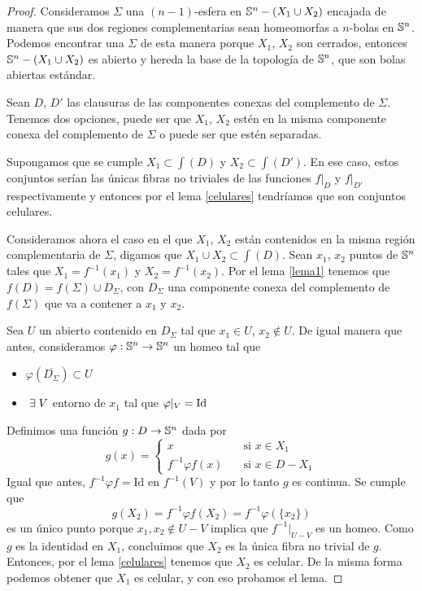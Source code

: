 \begin{proof}
    Consideramos $\Sigma$ una $(n-1)$-esfera en $\mathbb{S}^n-(X_1\cup X_2)$ encajada de manera que sus dos regiones complementarias sean homeomorfas a $n$-bolas en $\mathbb{S}^n$. Podemos encontrar una $\Sigma$ de esta manera porque $X_1$, $X_2$ son cerrados, entonces $\mathbb{S}^n - (X_1\cup X_2)$ es abierto y hereda la base de la topología de $\mathbb{S}^n$, que son bolas abiertas estándar.


    Sean $D$, $D'$ las clausuras de las componentes conexas del complemento de $\Sigma$.  Tenemos dos opciones, puede ser que $X_1$, $X_2$ estén en la misma componente conexa del complemento de $\Sigma$ o puede ser que estén separadas. 
    
    Supongamos que se cumple $X_1\subset\int(D)$ y $X_2\subset\int(D')$. En ese caso, estos conjuntos serían las únicas fibras no triviales de las funciones $f|_{D}$ y $f|_{D'}$ respectivamente y entonces por el lema \ref{celulares} tendríamos que son conjuntos celulares.

    Consideramos ahora el caso en el que $X_1$, $X_2$ están contenidos en la misma región complementaria de $\Sigma$, digamos que $X_1\cup X_2\subset\int(D)$. Sean $x_1,\, x_2$ puntos de $\mathbb{S}^n$ tales que $X_1=f^{-1}(x_1)$ y $X_2=f^{-1}(x_2)$. Por el lema \ref{lema1} tenemos que $f(D)=f(\Sigma)\cup D_\Sigma$, con $D_\Sigma$ una componente conexa del complemento de $f(\Sigma)$ que va a contener a $x_1$ y $x_2$.

    Sea $U$ un abierto contenido en $D_\Sigma$ tal que $x_1\in U$, $x_2\not\in U$. De igual manera que antes, consideramos $\varphi:\mathbb{S}^n\to\mathbb{S}^n$ un homeo tal que\begin{itemize}
        \item $\varphi(\overline{D_\Sigma})\subset U$
        \item $\;\exists\; V$ entorno de $x_1$ tal que $\varphi|_{V}=\text{Id}$
    \end{itemize}
    
    Definimos una función $g:D\to \mathbb{S}^n$ dada por $$g(x)=
    \begin{cases}
    x \quad &\text{si } x\in X_1\\ 
    f^{-1} \varphi f(x)\quad &\text{si } x\in D-X_1
    \end{cases}$$
    Igual que antes, $f^{-1}\varphi f=\text{Id}$ en $f^{-1}(V)$ y por lo tanto $g$ es continua. Se cumple que $$g(X_2)=f^{-1} \varphi f(X_2)=f^{-1} \varphi (\{x_2\})$$ es un único punto porque $x_1,x_2\not\in U-V$ implica que $f^{-1}|_{U-V}$ es un homeo. Como $g$ es la identidad en $X_1$, concluimos que $X_2$ es la única fibra no trivial de $g$. Entonces, por el lema \ref{celulares} tenemos que $X_2$ es celular. De la misma forma podemos obtener que $X_1$ es celular, y con eso probamos el lema.
\end{proof}
